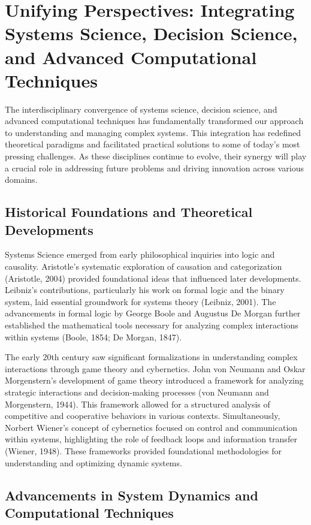 \documentclass[twocolumn]{article}
\begin{document}
\section{Unifying Perspectives: Integrating Systems Science, Decision Science, and Advanced Computational Techniques}

\textcolor{primary}{The interdisciplinary convergence of systems science, decision science, and advanced computational techniques has fundamentally transformed our approach to understanding and managing complex systems. This integration has redefined theoretical paradigms and facilitated practical solutions to some of today’s most pressing challenges. As these disciplines continue to evolve, their synergy will play a crucial role in addressing future problems and driving innovation across various domains.}

\subsection{Historical Foundations and Theoretical Developments}

\textcolor{primary}{Systems Science emerged from early philosophical inquiries into logic and causality. Aristotle's systematic exploration of causation and categorization (Aristotle, 2004) provided foundational ideas that influenced later developments. Leibniz’s contributions, particularly his work on formal logic and the binary system, laid essential groundwork for systems theory (Leibniz, 2001). The advancements in formal logic by George Boole and Augustus De Morgan further established the mathematical tools necessary for analyzing complex interactions within systems (Boole, 1854; De Morgan, 1847).}


\textcolor{secondary}{The early 20th century saw significant formalizations in understanding complex interactions through game theory and cybernetics. John von Neumann and Oskar Morgenstern's development of game theory introduced a framework for analyzing strategic interactions and decision-making processes (von Neumann and Morgenstern, 1944). This framework allowed for a structured analysis of competitive and cooperative behaviors in various contexts. Simultaneously, Norbert Wiener's concept of cybernetics focused on control and communication within systems, highlighting the role of feedback loops and information transfer (Wiener, 1948). These frameworks provided foundational methodologies for understanding and optimizing dynamic systems.}

\subsection{Advancements in System Dynamics and Computational Techniques}
\end{document}
